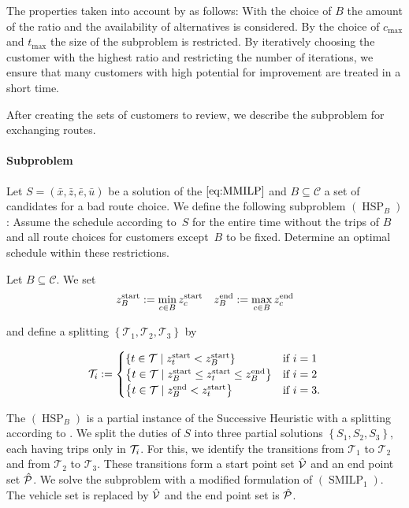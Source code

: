 The properties taken into account by  as follows: With the choice of $B$ the amount of the ratio and the availability of alternatives is considered. By the choice of $c_{\max}$ and $t_{\max}$ the size of the subproblem is restricted. By iteratively choosing the customer with the highest ratio and restricting the number of iterations, we ensure that many customers with high potential for improvement are treated in a short time.

After creating the sets of customers to review, we describe the subproblem for exchanging routes.

\paragraph{Subproblem} \parfill

Let $S=\left(\bar{x},\bar{z},\bar{e},\bar{u}\right)$ be a solution of the $\eqref{eq:MMILP}$ and $B\subseteq\mathcal{C}$ a set of candidates for a bad route choice. We define the following subproblem $(\operatorname{HSP}_B)$: Assume the schedule according to~$S$ for the entire time without the trips of $B$ and all route choices for customers except~$B$ to be fixed. Determine an optimal schedule within these restrictions.

\begin{definition}
\label{def:splitting_HSP}

Let ${B\subseteq\mathcal{C}}$. We set
\begin{align*}
	z^{\operatorname{start}}_B := \min_{c\in B}z^{\operatorname{start}}_c && z^{\operatorname{end}}_B := \max_{c\in B}z^{\operatorname{end}}_c
\end{align*}

and define a splitting $\left\{\mathcal{T}_1,\mathcal{T}_2,\mathcal{T}_3\right\}$ by

\begin{align*}
	\mathcal{T}_i := \begin{cases}
		\left\{t\in\mathcal{T}\mid z^{\operatorname{start}}_t<z^{\operatorname{start}}_B\right\} & \text{if } i=1 \\
		\left\{t\in\mathcal{T}\mid z^{\operatorname{start}}_B\leq z^{\operatorname{start}}_t\leq z^{\operatorname{end}}_B\right\} & \text{if } i=2 \\
		\left\{t\in\mathcal{T}\mid z^{\operatorname{end}}_B<z^{\operatorname{start}}_t\right\} & \text{if } i=3.
	\end{cases}
\end{align*}

\end{definition}

The $(\operatorname{HSP}_B)$ is a partial instance of the Successive Heuristic with a splitting according to . We split the duties of $S$ into three partial solutions $\left\{S_1,S_2,S_3\right\}$, each having trips only in $\mathcal{T}_i$. For this, we identify the transitions from $\mathcal{T}_1$ to $\mathcal{T}_2$ and from $\mathcal{T}_2$ to $\mathcal{T}_3$. These transitions form a start point set $\hat{\mathcal{V}}$ and an end point set $\hat{\mathcal{P}}$. We solve the subproblem with a modified formulation of $(\operatorname{SMILP}_1)$. The vehicle set is replaced by $\hat{\mathcal{V}}$ and the end point set is $\hat{\mathcal{P}}$.

